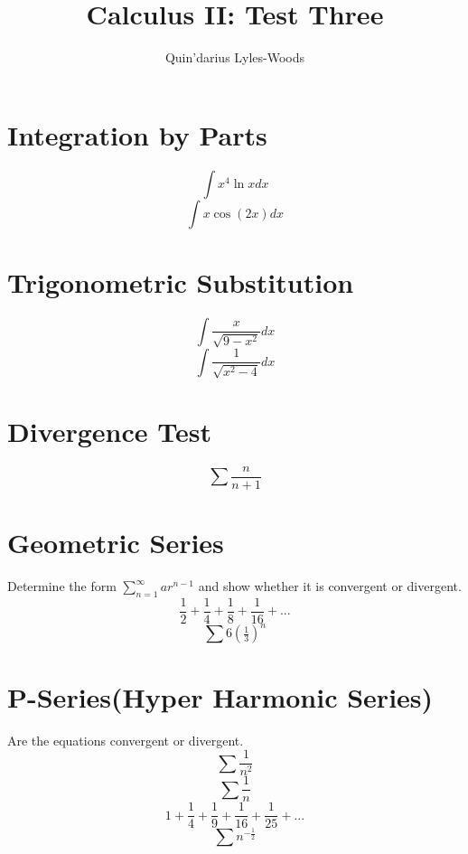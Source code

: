 \documentclass{article}
\title{Calculus II: Test Three}
\author{Quin'darius Lyles-Woods}
\begin{document}
\maketitle
\Large
\section{Integration by Parts}
\begin{equation}
	\int
	x^4 \ln x dx
\end{equation}
\vspace{3.25in}
\begin{equation}
	\int
	x \cos(2x) dx
\end{equation}
\pagebreak
\section{Trigonometric Substitution}
\begin{equation}
	\int 
	\frac{x}
	{\sqrt{9-x^2}}dx
\end{equation}
\vspace{3.5in}
\begin{equation}
	\int 
	\frac{1}
	{\sqrt{x^2-4}}
	dx
\end{equation}
\pagebreak
\section{Divergence Test}
\begin{equation}
	\sum
	\frac
	{n}
	{n+1}
\end{equation}
\pagebreak
\section{Geometric Series}
Determine the form $\sum^\infty_{n=1} ar^{n-1}$ and show whether it is convergent or divergent.
\begin{equation}
	\frac{1}{2}+
	\frac{1}{4}+
	\frac{1}{8}+
	\frac{1}{16}+...
\end{equation}
\vspace{3.5in}
\begin{equation}
	\sum
	6(\tfrac{1}{3})^n
\end{equation}
\pagebreak
\section{P-Series(Hyper Harmonic Series)}
Are the equations convergent or divergent.
\begin{equation}
	\sum
	\frac
	{1}
	{n^2}
\end{equation}
\vspace{2in}
\begin{equation}
	\sum
	\frac
	{1}
	{n}
\end{equation}
\vspace{2in}
\begin{equation}
	1+
	\frac{1}{4}+
	\frac{1}{9}+
	\frac{1}{16}+
	\frac{1}{25}+...
\end{equation}
\vspace{2in}
\begin{equation}
	\sum
	n^{-\frac{1}{2}}
\end{equation}
\pagebreak
\end{document}
